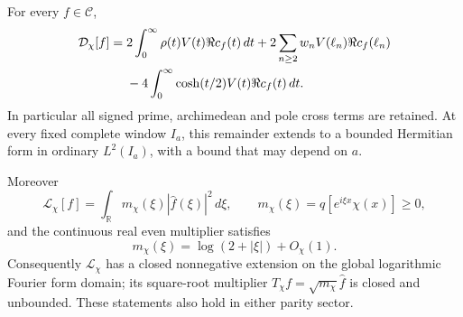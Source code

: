 \begin{proposition}
\label{prop:ns50-localization}
For every $f\in\mathcal C$,
\begin{align}
 \mathcal D_\chi[f]={}&
  2\int_0^\infty \rho(t)V(t)\Re c_f(t)\,dt
  +2\sum_{n\ge2}w_n V(\ell_n)\Re c_f(\ell_n)\notag\\
 &-4\int_0^\infty\cosh(t/2)V(t)\Re c_f(t)\,dt.
 \label{eq:ns50-remainder}
\end{align}
In particular all signed prime, archimedean and pole cross terms are
retained. At every fixed complete window $I_a$, this remainder extends
to a bounded Hermitian form in ordinary $L^2(I_a)$, with a bound that
may depend on $a$.

Moreover
\begin{equation}\label{eq:ns50-multiplier}
 \mathcal L_\chi[f]=\int_{\mathbb R}
                m_\chi(\xi)|\widehat f(\xi)|^2\,d\xi,
 \qquad m_\chi(\xi)=q[e^{i\xi x}\chi(x)]\ge0,
\end{equation}
and the continuous real even multiplier satisfies
\begin{equation}\label{eq:ns50-high-frequency}
 m_\chi(\xi)=\log(2+|\xi|)+O_\chi(1).
\end{equation}
Consequently $\mathcal L_\chi$ has a closed nonnegative extension
on the global logarithmic Fourier form domain; its square-root
multiplier $T_\chi f=\sqrt{m_\chi}\widehat f$ is closed and unbounded.
These statements also hold in either parity sector.
\end{proposition}
